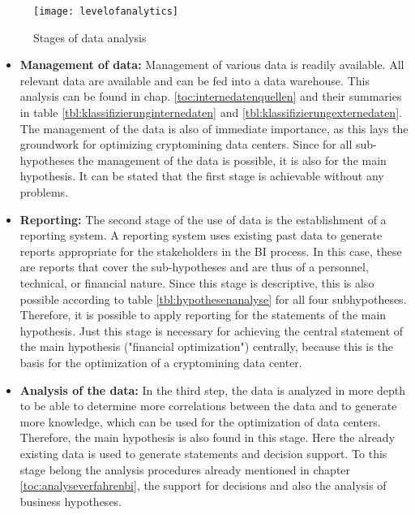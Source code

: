 \begin{figure}[H]
    \caption{Stages of data analysis}
    \texttt{[image: levelofanalytics]}
    \label{figure:levelofanalysis}
    \\
    \cite[Source: Based on][Fig. 2]{bihani2014comparative}
\end{figure}

\begin{itemize}
    \item \textbf{Management of data: }Management of various data is readily available. All relevant
    data are available and can be fed into a data warehouse. This analysis can be found in chap.
    \ref{toc:internedatenquellen} and their summaries in table \ref{tbl:klassifizierunginternedaten} and
    \ref{tbl:klassifizierungexternedaten}. The management of the data is also of immediate
    importance, as this lays the groundwork for optimizing cryptomining data centers. Since for all sub-hypotheses
    the management of the data is possible, it is also for the main hypothesis. It can be stated that the first
    stage is achievable without any problems.
    \item \textbf{Reporting: }The second stage of the use of data is the establishment of a reporting system. A reporting system
    uses existing past data to generate reports appropriate for the stakeholders in the \ac{BI} process.
    In this case, these are reports that cover the sub-hypotheses and are thus of a personnel, technical, or financial
    nature. Since this
    stage is descriptive, this is also possible according to table \ref{tbl:hypothesenanalyse} for all four subhypotheses.
    Therefore, it is possible to apply reporting for the statements of the main hypothesis. Just this stage is necessary for
    achieving the central statement of the main hypothesis ("financial optimization") centrally, because this is the basis
    for the optimization of a cryptomining data center.
    \item \textbf{Analysis of the data: }In the third step, the data is analyzed in more depth to be able to determine more correlations between the
    data and to generate more knowledge, which can be used for the optimization of data centers.
    Therefore, the main hypothesis is also found in this stage. Here the already
    existing data is used to generate statements and decision support. To this stage belong the
    analysis procedures already mentioned in chapter \ref{toc:analyseverfahrenbi}, the support for decisions and also
    the analysis of business hypotheses.

\end{itemize}
